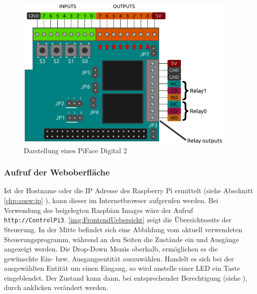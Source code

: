  
 \begin{figure}[H]
 	\begin{center}
 		\includegraphics[width=0.95\textwidth]{./images/pifacedigital2_diagram.png}
 		\caption[Darstellung eines PiFace Digital 2]{Darstellung eines PiFace Digital 2 \cite{URL:Pfd}}
 		\label{img:PiFaceDigital2}
 	\end{center} 
 \end{figure}	

 \subsubsection{Aufruf der Weboberfläche}
Ist der Hostname oder die IP Adresse des Raspberry Pi ermittelt (siehe Abschnitt \ref{chp:ausw:ip} ), kann dieser im Internetbrowser aufgerufen werden. Bei Verwendung des beigelegten Raspbian Images wäre der Aufruf \texttt{http://ControlPi3}. \autoref{img:FrontendUebersicht} zeigt die Übersichtsseite der Steuerung. In der Mitte befindet sich eine Abbildung vom aktuell verwendeten Steuerungsprogramm, während an den Seiten die Zustände ein und Ausgänge angezeigt werden. Die Drop-Down Menüs oberhalb, ermöglichen es die gewünschte Ein- bzw. Ausgangsentität auszuwählen. Handelt es sich bei der ausgewählten Entität um einen Eingang, so wird anstelle einer LED ein Taste eingeblendet. Der Zustand kann dann, bei entsprechender Berechtigung (siehe  ), durch anklicken verändert werden.  

